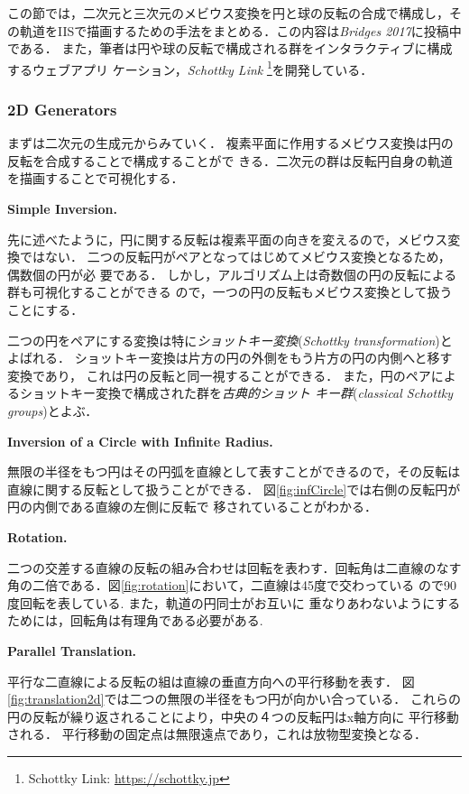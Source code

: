 この節では，二次元と三次元のメビウス変換を円と球の反転の合成で構成し，そ
の軌道をIISで描画するための手法をまとめる．この内容は\textit{Bridges
2017}に投稿中である．
また，筆者は円や球の反転で構成される群をインタラクティブに構成するウェブアプリ
ケーション，{\it Schottky Link} \footnote{Schottky Link:
\url{https://schottky.jp}}を開発している．

\subsubsection{2D Generators}

まずは二次元の生成元からみていく．
複素平面に作用するメビウス変換は円の反転を合成することで構成することがで
きる．二次元の群は反転円自身の軌道を描画することで可視化する．

\noindent\textbf{Simple Inversion.}

先に述べたように，円に関する反転は複素平面の向きを変えるので，メビウス変
換ではない．
二つの反転円がペアとなってはじめてメビウス変換となるため，偶数個の円が必
要である．
しかし，アルゴリズム上は奇数個の円の反転による群も可視化することができる
ので，一つの円の反転もメビウス変換として扱うことにする．

二つの円をペアにする変換は特に\emph{ショットキー変換}(\textit{Schottky
transformation})とよばれる．
ショットキー変換は片方の円の外側をもう片方の円の内側へと移す変換であり，
これは円の反転と同一視することができる．
また，円のペアによるショットキー変換で構成された群を\emph{古典的ショット
キー群}(\textit{classical Schottky groups})とよぶ．

\noindent\textbf{Inversion of a Circle with Infinite Radius.}

無限の半径をもつ円はその円弧を直線として表すことができるので，その反転は
直線に関する反転として扱うことができる．
図\ref{fig:infCircle}では右側の反転円が円の内側である直線の左側に反転で
移されていることがわかる．

\noindent\textbf{Rotation.}

二つの交差する直線の反転の組み合わせは回転を表わす．回転角は二直線のなす
角の二倍である．図\ref{fig:rotation}において，二直線は45度で交わっている
ので90度回転を表している. また，軌道の円同士がお互いに
重なりあわないようにするためには，回転角は有理角である必要がある.

\noindent\textbf{Parallel Translation.}

平行な二直線による反転の組は直線の垂直方向への平行移動を表す．
図\ref{fig:translation2d}では二つの無限の半径をもつ円が向かい合っている．
これらの円の反転が繰り返されることにより，中央の４つの反転円はx軸方向に
平行移動される．
平行移動の固定点は無限遠点であり，これは放物型変換となる．

